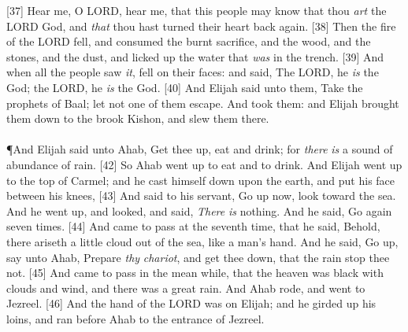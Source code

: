 [37] \textcolor[cmyk]{0.99998,1,0,0}{Hear me, O LORD, hear me, that this people may know that thou \emph{art} the LORD God, and \emph{that} thou hast turned their heart back again.}
[38] \textcolor[cmyk]{0.99998,1,0,0}{Then the fire of the LORD fell, and consumed the burnt sacrifice, and the wood, and the stones, and the dust, and licked up the water that \emph{was} in the trench.}
[39] \textcolor[cmyk]{0.99998,1,0,0}{And when all the people saw \emph{it},   fell on their faces: and   said, The LORD, he \emph{is} the God; the LORD, he \emph{is} the God.}
[40] \textcolor[cmyk]{0.99998,1,0,0}{And Elijah said unto them, Take the prophets of Baal; let not one of them escape. And   took them: and Elijah brought them down to the brook Kishon, and slew them there.}\\
\\
\P  \textcolor[cmyk]{0.99998,1,0,0}{And Elijah said unto Ahab, Get thee up, eat and drink; for \emph{there} \emph{is} a sound of abundance of rain.}
[42] \textcolor[cmyk]{0.99998,1,0,0}{So Ahab went up to eat and to drink. And Elijah went up to the top of Carmel; and he cast himself down upon the earth, and put his face between his knees,}
[43] \textcolor[cmyk]{0.99998,1,0,0}{And said to his servant, Go up now, look toward the sea. And he went up, and looked, and said, \emph{There} \emph{is} nothing. And he said, Go again seven times.}
[44] \textcolor[cmyk]{0.99998,1,0,0}{And  came to pass at the seventh time, that he said, Behold, there ariseth a little cloud out of the sea, like a man's hand. And he said, Go up, say unto Ahab, Prepare \emph{thy} \emph{chariot}, and get thee down, that the rain stop thee not.}
[45] \textcolor[cmyk]{0.99998,1,0,0}{And  came to pass in the mean while, that the heaven was black with clouds and wind, and there was a great rain. And Ahab rode, and went to Jezreel.}
[46] \textcolor[cmyk]{0.99998,1,0,0}{And the hand of the LORD was on Elijah; and he girded up his loins, and ran before Ahab to the entrance of Jezreel.}

